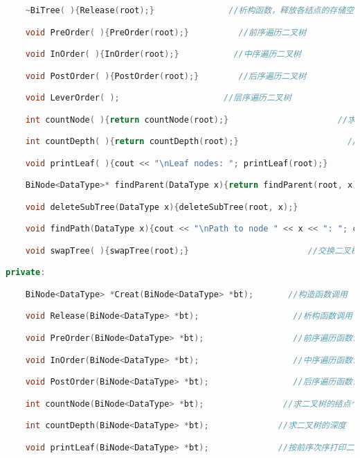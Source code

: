 \begin{lstlisting}[language=C++]
    ~BiTree( ){Release(root);}               //析构函数，释放各结点的存储空间

    void PreOrder( ){PreOrder(root);}          //前序遍历二叉树

    void InOrder( ){InOrder(root);}           //中序遍历二叉树

    void PostOrder( ){PostOrder(root);}        //后序遍历二叉树

    void LeverOrder( );                     //层序遍历二叉树

    int countNode( ){return countNode(root);}                      //求二叉树的结点个数

    int countDepth( ){return countDepth(root);}                      //求二叉树的深度

    void printLeaf( ){cout << "\nLeaf nodes: "; printLeaf(root);}                       //按前序次序打印二叉树中的叶子结点

    BiNode<DataType>* findParent(DataType x){return findParent(root, x);}                      //求二叉树中结点×的双亲

    void deleteSubTree(DataType x){deleteSubTree(root, x);}                   //在二叉树中删除以值×为根结点的子树

    void findPath(DataType x){cout << "\nPath to node " << x << ": "; char path[100]; int len = 0; findPath(root, x, path, len);}                        //求从根结点到p所指结点之间的路径

    void swapTree( ){swapTree(root);}                        //交换二叉树中所有结点的左右子树

private:

    BiNode<DataType> *Creat(BiNode<DataType> *bt);       //构造函数调用

    void Release(BiNode<DataType> *bt);                   //析构函数调用

    void PreOrder(BiNode<DataType> *bt);                  //前序遍历函数调用

    void InOrder(BiNode<DataType> *bt);                   //中序遍历函数调用

    void PostOrder(BiNode<DataType> *bt);                 //后序遍历函数调用

    int countNode(BiNode<DataType> *bt);                //求二叉树的结点个数

    int countDepth(BiNode<DataType> *bt);              //求二叉树的深度

    void printLeaf(BiNode<DataType> *bt);              //按前序次序打印二叉树中的叶子结点


\end{lstlisting}
